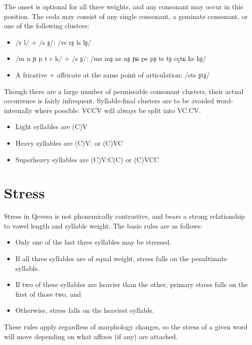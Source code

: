 \documentclass[grammar]{subfiles}
\begin{document}
The onset is optional for all three weights, and any consonant may occur in
this position. The coda may consist of any single consonant, a geminate
consonant, or one of the following clusters:

\begin{itemize}
  \item /r l/ + /s ʂ/: /rs rʂ ls lʂ/
  \item /m n ɲ p t c k/ + /s ʂ/: /ms mʂ ns nʂ ɲɕ ps pʂ ts tʂ cç\tlde tɕ ks kʂ/
  \item A fricative + affricate at the same point of articulation: /sts ʂtʂ/
\end{itemize}

Though there are a large number of permissable consonant clusters, their actual
occurrence is fairly infrequent.  Syllable-final clusters are to be avoided
word-internally where possible: VCCV will always be split into VC.CV\@. 

\begin{itemize}
  \item Light syllables are (C)V
  \item Heavy syllables are (C)Vː or (C)VC
  \item Superheavy syllables are (C)VːC(C) or (C)VCC
\end{itemize}

\section{Stress}
\label{sec:stress}

Stress in Qevesa is not phonemically contrastive, and bears a strong
relationship to vowel length and syllable weight. The basic rules are as
follows: 

\begin{itemize}
  \item Only one of the last three syllables may be stressed.
  \item If all three syllables are of equal weight, stress falls on the penultimate syllable.
  \item If two of these syllables are heavier than the other, primary stress falls on the first of those two, and 
  \item Otherwise, stress falls on the heaviest syllable.
\end{itemize}

These rules apply regardless of morphology changes, so the stress of a given
word will move depending on what affixes (if any) are attached.
\end{document}

